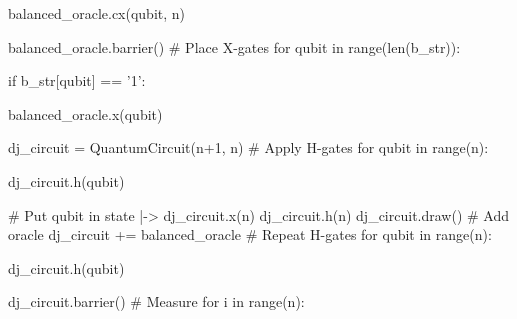 \documentclass{article}
\begin{document}
{\hspace{0.5cm}
\begin{minipage}{0.3\textwidth}
balanced\_oracle.cx(qubit, n)
 \end{minipage}
\newline
\newline
balanced\_oracle.barrier()
\newline
\newline
\# Place X-gates
\newline
for qubit in range(len(b\_str)):

\hspace{0.5cm}
\begin{minipage}{0.3\textwidth}
 if b\_str[qubit] == '1':
 \end{minipage}

\hspace{1cm}
\begin{minipage}{0.3\textwidth}
balanced\_oracle.x(qubit)
 \end{minipage}
\newline
\newline
dj\_circuit = QuantumCircuit(n+1, n)
\newline
\# Apply H-gates
\newline
for qubit in range(n):

\hspace{0.5cm}
\begin{minipage}{0.3\textwidth}
dj\_circuit.h(qubit)
 \end{minipage}
\newline
\newline
\# Put qubit in state |->
\newline
dj\_circuit.x(n)
\newline
dj\_circuit.h(n)
\newline
dj\_circuit.draw()
\newline
\newline
\# Add oracle
\newline
dj\_circuit += balanced\_oracle
\newline
\newline
\# Repeat H-gates
\newline
for qubit in range(n):

\hspace{0.5cm}
\begin{minipage}{0.3\textwidth}
dj\_circuit.h(qubit)
 \end{minipage}
\newline
dj\_circuit.barrier()
\newline
\newline
\# Measure
\newline
for i in range(n):

}
\end{document}
